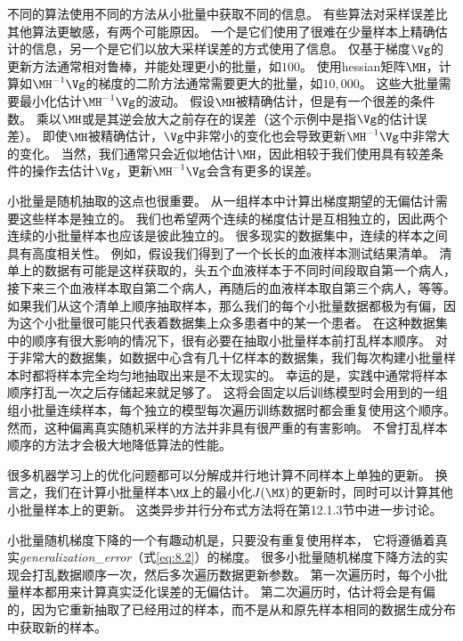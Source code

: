 不同的算法使用不同的方法从小批量中获取不同的信息。
有些算法对采样误差比其他算法更敏感，有两个可能原因。
一个是它们使用了很难在少量样本上精确估计的信息，另一个是它们以放大采样误差的方式使用了信息。
仅基于梯度$\Vg$的更新方法通常相对鲁棒，并能处理更小的批量，如$100$。
使用\gls{hessian}矩阵$\MH$，计算如$\MH^{-1}\Vg$的梯度的二阶方法通常需要更大的批量，如$10,000$。
这些大批量需要最小化估计$\MH^{-1}\Vg$的波动。
假设$\MH$被精确估计，但是有一个很差的条件数。
乘以$\MH$或是其逆会放大之前存在的误差（这个示例中是指$\Vg$的估计误差）。
即使$\MH$被精确估计，$\Vg$中非常小的变化也会导致更新$\MH^{-1}\Vg$中非常大的变化。
当然，我们通常只会近似地估计$\MH$，因此相较于我们使用具有较差条件的操作去估计$\Vg$，更新$\MH^{-1}\Vg$会含有更多的误差。


小批量是随机抽取的这点也很重要。
从一组样本中计算出梯度期望的无偏估计需要这些样本是独立的。
我们也希望两个连续的梯度估计是互相独立的，因此两个连续的小批量样本也应该是彼此独立的。
很多现实的数据集中，连续的样本之间具有高度相关性。
例如，假设我们得到了一个长长的血液样本测试结果清单。
清单上的数据有可能是这样获取的，头五个血液样本于不同时间段取自第一个病人，接下来三个血液样本取自第二个病人，再随后的血液样本取自第三个病人，等等。
如果我们从这个清单上顺序抽取样本，那么我们的每个小批量数据都极为有偏，因为这个小批量很可能只代表着数据集上众多患者中的某一个患者。
在这种数据集中的顺序有很大影响的情况下，很有必要在抽取小批量样本前打乱样本顺序。
对于非常大的数据集，如数据中心含有几十亿样本的数据集，我们每次构建小批量样本时都将样本完全均匀地抽取出来是不太现实的。
幸运的是，实践中通常将样本顺序打乱一次之后存储起来就足够了。
这将会固定以后训练模型时会用到的一组组小批量连续样本，每个独立的模型每次遍历训练数据时都会重复使用这个顺序。
然而，这种偏离真实随机采样的方法并非具有很严重的有害影响。
不曾打乱样本顺序的方法才会极大地降低算法的性能。

很多机器学习上的优化问题都可以分解成并行地计算不同样本上单独的更新。
换言之，我们在计算小批量样本$\MX$上的最小化$J(\MX)$的更新时，同时可以计算其他小批量样本上的更新。
这类异步并行分布式方法将在第12.1.3节中进一步讨论。

小批量随机梯度下降的一个有趣动机是，只要没有重复使用样本，
它将遵循着真实\emph{\gls{generalization_error}}（式\ref{eq:8.2}）的梯度。
很多小批量随机梯度下降方法的实现会打乱数据顺序一次，然后多次遍历数据更新参数。
第一次遍历时，每个小批量样本都用来计算真实泛化误差的无偏估计。
第二次遍历时，估计将会是有偏的，因为它重新抽取了已经用过的样本，而不是从和原先样本相同的数据生成分布中获取新的样本。


